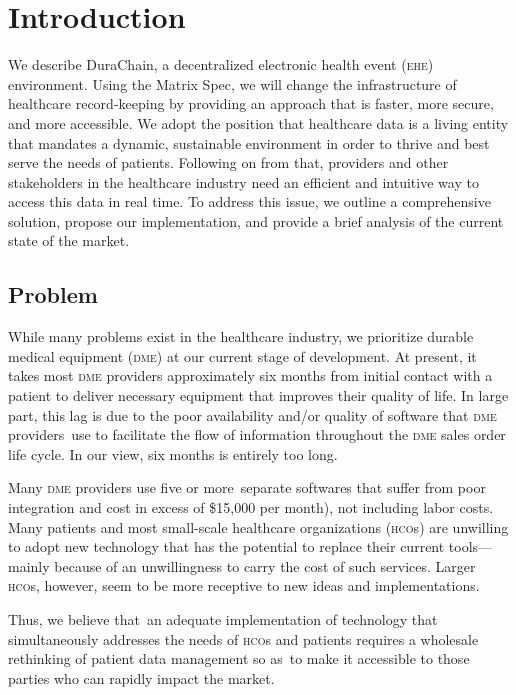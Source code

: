 
\section{Introduction}
We describe DuraChain, a decentralized electronic health event (\textsc{ehe}) environment. Using the Matrix Spec,\cite{matrixspec}
we will change the infrastructure of healthcare record-keeping by providing an approach that is faster, more secure, and more accessible. We adopt the position that healthcare data is a living entity that mandates a dynamic, sustainable environment in order to thrive and best serve the needs of patients. Following on from that, providers and other stakeholders in the healthcare industry need an efficient and intuitive way to access this data in real time. To address this issue, we outline a comprehensive solution, propose our implementation, and provide a brief analysis of the current state of the market.%

\subsection{Problem}
While many problems exist in the healthcare industry, we prioritize durable medical equipment (\textsc{dme}) at our current stage of development. At present, it takes most \textsc{dme} providers approximately six months from initial contact with a patient to deliver necessary equipment that improves their quality of life. In large part, this lag is due to the poor availability and/or quality of software that \textsc{dme} providers use to facilitate the flow of information throughout the \textsc{dme} sales order life cycle. In our view, six months is entirely too long.%

Many \textsc{dme} providers use five or more separate softwares that suffer from poor integration and cost in excess of \$15,000 per month), not including labor costs. Many patients and most small-scale healthcare organizations (\textsc{hco}s) are unwilling to adopt new technology that has the potential to replace their current tools---mainly because of an unwillingness to carry the cost of such services. Larger \textsc{hco}s, however, seem to be more receptive to new ideas and implementations.﻿%

Thus, we believe that an adequate implementation of technology that simultaneously addresses the needs of \textsc{hco}s and patients requires a wholesale rethinking of patient data management so as to make it accessible to those parties who can rapidly impact the market.%

